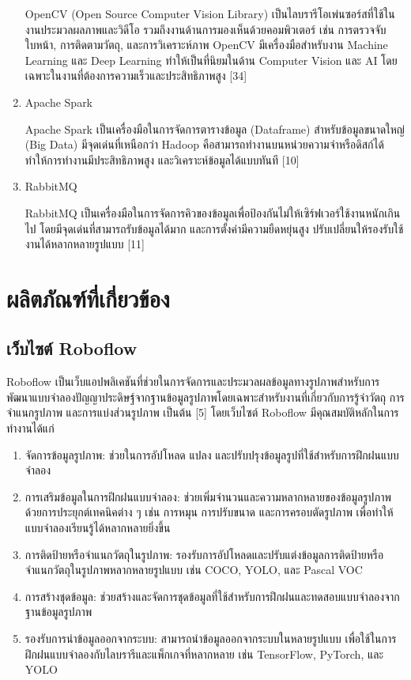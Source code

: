 \documentclass[12pt,oneside,openright,a4paper]{cpe-thai-project}
\begin{document}
\begin{enumerate}
	\hspace{2em} OpenCV (Open Source Computer Vision Library) เป็นไลบรารีโอเพ่นซอร์สที่ใช้ในงานประมวลผลภาพและวิดีโอ รวมถึงงานด้านการมองเห็นด้วยคอมพิวเตอร์ เช่น การตรวจจับใบหน้า, การติดตามวัตถุ, และการวิเคราะห์ภาพ OpenCV มีเครื่องมือสำหรับงาน Machine Learning และ Deep Learning ทำให้เป็นที่นิยมในด้าน Computer Vision และ AI โดยเฉพาะในงานที่ต้องการความเร็วและประสิทธิภาพสูง [34]
\item Apache Spark

	\hspace{2em} Apache Spark เป็นเครื่องมือในการจัดการตารางข้อมูล (Dataframe) สำหรับข้อมูลขนาดใหญ่ (Big Data) มีจุดเด่นที่เหนือกว่า Hadoop คือสามารถทำงานบนหน่วยความจำหรือดิสก์ได้ ทำให้การทำงานมีประสิทธิภาพสูง และวิเคราะห์ข้อมูลได้แบบทันที [10]
\item RabbitMQ

	\hspace{2em} RabbitMQ เป็นเครื่องมือในการจัดการคิวของข้อมูลเพื่อป้องกันไม่ให้เซิร์ฟเวอร์ใช้งานหนักเกินไป โดยมีจุดเด่นที่สามารถรับข้อมูลได้มาก และการตั้งค่ามีความยืดหยุ่นสูง ปรับเปลี่ยนให้รองรับใช้งานได้หลากหลายรูปแบบ [11]
\end{enumerate}

\section{ผลิตภัณฑ์ที่เกี่ยวข้อง}
\subsection{เว็บไซต์ Roboflow}

	\hspace{2em} Roboflow เป็นเว็บแอปพลิเคชันที่ช่วยในการจัดการและประมวลผลข้อมูลทางรูปภาพสำหรับการพัฒนาแบบจำลองปัญญาประดิษฐ์จากฐานข้อมูลรูปภาพโดยเฉพาะสำหรับงานที่เกี่ยวกับการรู้จำวัตถุ การจำแนกรูปภาพ และการแบ่งส่วนรูปภาพ เป็นต้น [5]
โดยเว็บไซต์ Roboflow มีคุณสมบัติหลักในการทำงานได้แก่

\begin{enumerate}
\item จัดการข้อมูลรูปภาพ: ช่วยในการอัปโหลด แปลง และปรับปรุงข้อมูลรูปที่ใช้สำหรับการฝึกฝนแบบจำลอง
\item การเสริมข้อมูลในการฝึกฝนแบบจำลอง: ช่วยเพิ่มจำนวนและความหลากหลายของข้อมูลรูปภาพด้วยการประยุกต์เทคนิคต่าง ๆ เช่น การหมุน การปรับขนาด และการครอบตัดรูปภาพ เพื่อทำให้แบบจำลองเรียนรู้ได้หลากหลายยิ่งขึ้น
\item การติดป้ายหรือจำแนกวัตถุในรูปภาพ: รองรับการอัปโหลดและปรับแต่งข้อมูลการติดป้ายหรือจำแนกวัตถุในรูปภาพหลากหลายรูปแบบ เช่น COCO, YOLO, และ Pascal VOC
\item การสร้างชุดข้อมูล: ช่วยสร้างและจัดการชุดข้อมูลที่ใช้สำหรับการฝึกฝนและทดสอบแบบจำลองจากฐานข้อมูลรูปภาพ
\item รองรับการนำข้อมูลออกจากระบบ: สามารถนำข้อมูลออกจากระบบในหลายรูปแบบ เพื่อใช้ในการฝึกฝนแบบจำลองกับไลบรารีและแพ็กเกจที่หลากหลาย เช่น TensorFlow, PyTorch, และ YOLO
\end{enumerate}
\end{document}
